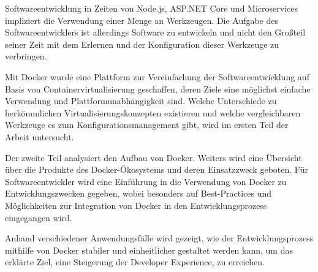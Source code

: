 Softwareentwicklung in Zeiten von Node.js, ASP.NET Core und Microservices impliziert die Verwendung einer Menge an Werkzeugen.
Die Aufgabe des Softwareentwicklers ist allerdings Software zu entwickeln und nicht den Großteil seiner Zeit mit dem Erlernen und der Konfiguration dieser Werkzeuge zu verbringen.

Mit Docker wurde eine Plattform zur Vereinfachung der Softwareentwicklung auf Basis von Containervirtualisierung geschaffen, deren Ziele eine möglichst einfache Verwendung und Plattformunabhängigkeit sind.
Welche Unterschiede zu herkömmlichen Virtualisierungskonzepten existieren und welche vergleichbaren Werkzeuge es zum Konfigurationsmanagement gibt, wird im ersten Teil der Arbeit untersucht.

Der zweite Teil analysiert den Aufbau von Docker.
Weiters wird eine Übersicht über die Produkte des Docker-Ökosystems und deren Einsatzzweck geboten.
Für Softwareentwickler wird eine Einführung in die Verwendung von Docker zu Entwicklungszwecken gegeben, wobei besonders auf Best-Practices und Möglichkeiten zur Integration von Docker in den Entwicklungsprozess eingegangen wird.

Anhand verschiedener Anwendungsfälle wird gezeigt, wie der Entwicklungsprozess mithilfe von Docker stabiler und einheitlicher gestaltet werden kann, um das erklärte Ziel, eine Steigerung der Developer Experience, zu erreichen.
